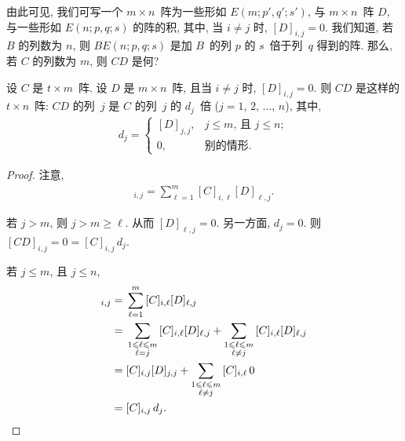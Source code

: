 \documentclass[../libro.tex]{subfiles}
\begin{document}
由此可见, 我们可写一个 \(m \times n\)~阵为一些形如
\(E(m; p', q'; s')\),
与 \(m \times n\)~阵 \(D\),
与一些形如 \(E(n; p, q; s)\) 的阵的积,
其中, 当 \(i \neq j\) 时, \([D]_{i,j} = 0\).
我们知道, 若 \(B\) 的列数为 \(n\),
则 \(B E(n; p, q; s)\)
是加 \(B\)~的列 \(p\) 的 \(s\)~倍于列~\(q\) 得到的阵.
那么, 若 \(C\) 的列数为 \(m\),
则 \(C D\) 是何?

\begin{theorem}
    设 \(C\) 是 \(t \times m\)~阵.
    设 \(D\) 是 \(m \times n\)~阵,
    且当 \(i \neq j\) 时, \([D]_{i,j} = 0\).
    则 \(CD\) 是这样的 \(t \times n\)~阵:
    \(CD\) 的列~\(j\) 是 \(C\) 的列~\(j\) 的 \(d_j\)~倍
    (\(j = 1\), \(2\), \(\dots\), \(n\)),
    其中,
    \begin{align*}
        d_j =
        \begin{cases}
            [D]_{j,j}, & \text{\(j \leq m\), 且 \(j \leq n\)}; \\
            0,         & \text{别的情形}.
        \end{cases}
    \end{align*}
\end{theorem}

\begin{proof}
    注意,
    \begin{align*}
        [C D]_{i,j}
        = \sum_{\ell = 1}^{m} {[C]_{i,\ell} [D]_{\ell,j}}.
    \end{align*}

    若 \(j > m\),
    则 \(j > m \geq \ell\).
    从而 \([D]_{\ell,j} = 0\).
    另一方面, \(d_j = 0\).
    则 \([C D]_{i,j} = 0 = [C]_{i,j}\, d_j\).

    若 \(j \leq m\), 且 \(j \leq n\),
    \begin{align*}
        [C D]_{i,j}
        = {} &
        \sum_{\ell = 1}^{m} {[C]_{i,\ell} [D]_{\ell,j}}
        \\
        = {} &
        \sum_{\substack{1 \leq \ell \leq m \\ \ell = j}}
        {[C]_{i,\ell} [D]_{\ell,j}}
        +
        \sum_{\substack{1 \leq \ell \leq m \\ \ell \neq j}}
        {[C]_{i,\ell} [D]_{\ell,j}}
        \\
        = {} &
        [C]_{i,j} [D]_{j,j}
        +
        \sum_{\substack{1 \leq \ell \leq m \\ \ell \neq j}}
        {[C]_{i,\ell}\, 0}
        \\
        = {} &
        [C]_{i,j}\, d_j.
        \qedhere
    \end{align*}
\end{proof}
\end{document}
